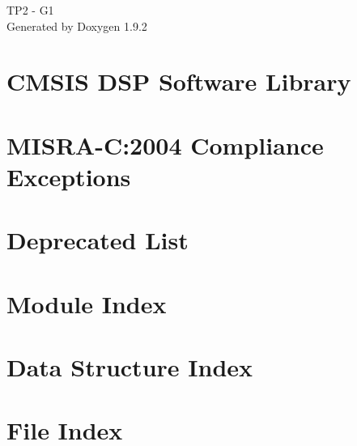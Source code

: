 \documentclass[twoside]{book}
\newcommand{\+}{\discretionary{\mbox{\scriptsize$\hookleftarrow$}}{}{}}
\newcommand{\clearemptydoublepage}{%
    \newpage{\pagestyle{empty}\cleardoublepage}%
  }
\begin{document}
  \raggedbottom
    \hypersetup{pageanchor=false,
                bookmarksnumbered=true,
                pdfencoding=unicode
               }
  \begin{titlepage}
  \vspace*{7cm}
  \begin{center}%
  {\Large TP2 -\/ G1}\\
  \vspace*{1cm}
  {\large Generated by Doxygen 1.9.2}\\
  \end{center}
  \end{titlepage}
  \clearemptydoublepage
  \tableofcontents
  \clearemptydoublepage
  \hypersetup{pageanchor=true}
\chapter{CMSIS DSP Software Library}
\label{index}\hypertarget{index}{}
\chapter{MISRA-\/C\+:2004 Compliance Exceptions}
\label{_c_m_s_i_s__m_i_s_r_a__exceptions}

\chapter{Deprecated List}
\label{deprecated}

\chapter{Module Index}

\chapter{Data Structure Index}

\chapter{File Index}

\end{document}
